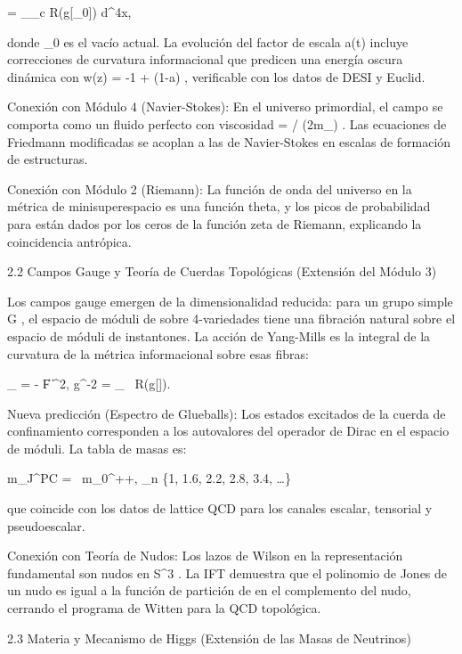 \documentclass[12pt,a4paper]{book}
\begin{document}
\Lambda =  \int_{_c} R(g[\rho_0])  d^4x,

donde  \rho_0  es el vacío actual. La evolución del factor de escala  a(t)  incluye correcciones de curvatura informacional que predicen una energía oscura dinámica con  w(z) = -1 + \epsilon (1-a) , verificable con los datos de DESI y Euclid.

Conexión con Módulo 4 (Navier-Stokes): En el universo primordial, el campo  \rho  se comporta como un fluido perfecto con viscosidad  \nu = \hbar / (2m_{}) . Las ecuaciones de Friedmann modificadas se acoplan a las de Navier-Stokes en escalas de formación de estructuras.

Conexión con Módulo 2 (Riemann): La función de onda del universo en la métrica de minisuperespacio es una función theta, y los picos de probabilidad para  \Lambda  están dados por los ceros de la función zeta de Riemann, explicando la coincidencia antrópica.

2.2 Campos Gauge y Teoría de Cuerdas Topológicas (Extensión del Módulo 3)

Los campos gauge emergen de la dimensionalidad reducida: para un grupo simple  G , el espacio de móduli de  \rho  sobre 4-variedades tiene una fibración natural sobre el espacio de móduli de instantones. La acción de Yang-Mills es la integral de la curvatura de la métrica informacional sobre esas fibras:

_{} = - \| F \|^2, \quad g^{-2} =  \int_{}  \, R(g[\rho]).

Nueva predicción (Espectro de Glueballs): Los estados excitados de la cuerda de confinamiento corresponden a los autovalores del operador de Dirac en el espacio de móduli. La tabla de masas es:

m_{J^{PC}} =  \, m_{0^{++}}, \quad \lambda_n \in \{1, 1.6, 2.2, 2.8, 3.4, \dots\}

que coincide con los datos de lattice QCD para los canales escalar, tensorial y pseudoescalar.

Conexión con Teoría de Nudos: Los lazos de Wilson en la representación fundamental son nudos en  S^3 . La IFT demuestra que el polinomio de Jones de un nudo es igual a la función de partición de  \rho  en el complemento del nudo, cerrando el programa de Witten para la QCD topológica.

2.3 Materia y Mecanismo de Higgs (Extensión de las Masas de Neutrinos)
\end{document}
